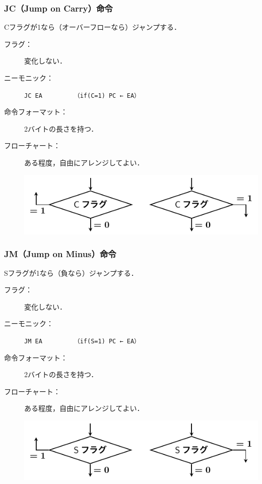 \documentclass[handout]{beamer}        %
\begin{document}
\begin{frame}
  \frametitle{JC（Jump on Carry）命令}
  Cフラグが1なら（オーバーフローなら）ジャンプする．
  \vfill
  \begin{description}
  \item[フラグ：] 変化しない．
    \vfill

  \item[ニーモニック：]\texttt{JC EA}~~~~~~~~~\texttt{（if(C=1) PC ← EA）}
    \vfill

  \item[命令フォーマット：] 2バイトの長さを持つ．\\
    \vfill

  \item[フローチャート：] ある程度，自由にアレンジしてよい．\\
    \centerline{\includegraphics[scale=0.7]{../Tikz/jc.pdf}}
  \end{description}
  \vfill
\end{frame}

\begin{frame}
  \frametitle{JM（Jump on Minus）命令}
  Sフラグが1なら（負なら）ジャンプする．
  \vfill
  \begin{description}
  \item[フラグ：] 変化しない．
    \vfill

  \item[ニーモニック：]\texttt{JM EA}~~~~~~~~~\texttt{（if(S=1) PC ← EA）}
    \vfill

  \item[命令フォーマット：] 2バイトの長さを持つ．\\
    \vfill

  \item[フローチャート：] ある程度，自由にアレンジしてよい．\\
    \centerline{\includegraphics[scale=0.7]{../Tikz/jm.pdf}}
  \end{description}
  \vfill
\end{frame}
\end{document}

